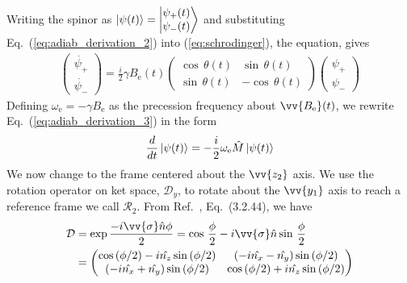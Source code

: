 %
Writing the spinor as
$\Ket{\psi(t)}=\Ket{\begin{matrix}
    \psi_{+}(t)\\
    \psi_{-}(t)
\end{matrix}}$ and substituting Eq.~(\ref{eq:adiab_derivation_2}) into (\ref{eq:schrodinger}), the \schrodinger equation, gives
%
\begin{gather}
    \left(\begin{matrix}
    \dot{\psi_{+}}\\
    \dot{\psi_{-}}
    \end{matrix}\right)=\frac{i}{2}\gamma B_\text{e}(t)\left(\begin{matrix}
    \cos\, \theta(t) & \sin\, \theta(t)\\
    \sin\, \theta(t) & -\cos\, \theta(t)
    \end{matrix}\right)\left(\begin{matrix}
    \psi_{+}\\
    \psi_{-}
    \end{matrix}\right) \label{eq:adiab_derivation_3}
\end{gather}
%
Defining $\omega_\text{e}=-\gamma B_\text{e}$ as the precession frequency about $\vv{B_\text{e}}(t)$, we rewrite Eq.~(\ref{eq:adiab_derivation_3}) in the form
%
\begin{gather}
    \frac{d}{dt}\Ket{\psi(t)}=-\frac{i}{2}\omega_\text{e}\hat{M}\Ket{\psi(t)}
    \label{eq:adiab_derivation_4}
\end{gather}
%
We now change to the frame centered about the $\vv{z_2}$ axis. We use the rotation operator on ket space, $\mathcal{D}_y$, to rotate about the $\vv{y_1}$ axis to reach a reference frame we call $\mathcal{R}_2$. From Ref.~\cite{sakurai_quantum}, Eq.~(3.2.44), we have
%
\begin{align}
    \mathcal{D} &= \exp{\frac{-i\vv{\sigma}\hat{n}\phi}{2}}=\cos \, \frac{\phi}{2}
                            -i\vv{\sigma}\hat{n} \sin \, \frac{\phi}{2} \nonumber \\
                &= \left(\begin{matrix}\cos\left(\phi / 2\right)-i\hat{n_{z}}\sin\left(\phi / 2\right) & (-i\hat{n_{x}}-\hat{n_{y}})\sin\left(\phi / 2\right) \\
                (-i\hat{n_{x}}+\hat{n_{y}})\sin\left(\phi / 2\right) & \cos\left(\phi / 2\right)+i\hat{n_{z}}\sin\left(\phi / 2\right)
                \end{matrix}\right) \label{eq:rotation_operator}
\end{align}
